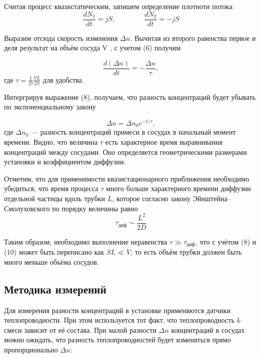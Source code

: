 \documentclass[a4paper]{article}
\begin{document}
Считая процесс квазистатическим, запишем определение плотноти потока:
\begin{equation}
    \frac{dN_1}{dt} = j S, \qquad \qquad \frac{dN_2}{dt} = -j S
\end{equation}

Выразим отсюда скорость изменения $\Delta n$. Вычитая из второго равенства
первое и деля результат на объём сосуда V , с учетом (6) получим

\begin{equation}
    \frac{d \left( \Delta n \right)}{dt} = - \frac{\Delta n}{\tau},
\end{equation}
где $\tau = \frac{1}{D} \frac{VL}{2S}$ для удобства.

Интергрируя выражение (8), получаем, что разность концентраций
будет убывать по экспоненциальному закону

\begin{equation}
    \Delta n = \Delta n_0 e^{-t/\tau}, 
\end{equation}
где $\Delta n_0$ — разность концентраций примеси в сосудах в начальный момент
времени. Видно, что величина $\tau$ есть характерное время выравнивания
концентраций между сосудами. Оно определяется геометрическими размерами
установки и коэффициентом диффузии.

Отметим, что для применимости квазистационарного приближения необходимо
убедиться, что время процесса $\tau$ много больше характерного
времени диффузии отдельной частицы вдоль трубки $L$, которое согласно
закону Эйнштейна–Смолуховского по порядку величины равно
\begin{equation}
    \tau_\text{диф} \sim \frac{L^2}{2 D}
\end{equation}

Таким образом, необходимо выполнение неравенства $\tau \gg \tau_\text{диф}$,
что с учётом (8) и (10) может быть переписано как $SL \ll V$, то есть объём трубки должен
быть много меньше объёма сосудов.

\subsection{Методика измерений}

Для измерения разности концентраций в
установке применяются датчики теплопроводности. При этом используется
тот факт, что теплопроводность $k$ смеси зависит от её состава. При малой разности $\Delta n$
концентраций в сосудах можно ожидать, что разность теплопроводностей будет
изменяться прямо пропорционально $\Delta n$:
\end{document}
